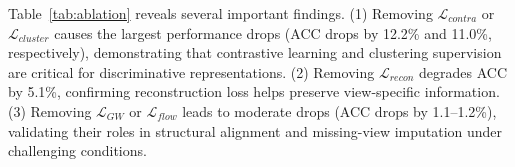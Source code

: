 \documentclass{article}
\theoremstyle{plain}
\theoremstyle{definition}
\theoremstyle{remark}
\begin{document}
\begin{table}[!htbp]
\centering
\caption{Ablation study on Scene-15. Best results are in \textbf{bold}.}
\label{tab:ablation}
\vskip 0.1in
\renewcommand{\arraystretch}{1.1}
\vskip -0.1in
\end{table}

Table~\ref{tab:ablation} reveals several important findings. (1) Removing $\mathcal{L}_{contra}$ or $\mathcal{L}_{cluster}$ causes the largest performance drops (ACC drops by 12.2\% and 11.0\%, respectively), demonstrating that contrastive learning and clustering supervision are critical for discriminative representations. (2) Removing $\mathcal{L}_{recon}$ degrades ACC by 5.1\%, confirming reconstruction loss helps preserve view-specific information. (3) Removing $\mathcal{L}_{GW}$ or $\mathcal{L}_{flow}$ leads to moderate drops (ACC drops by 1.1--1.2\%), validating their roles in structural alignment and missing-view imputation under challenging conditions.
\end{document}
